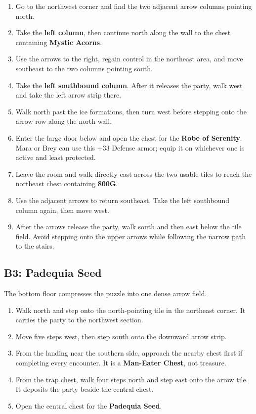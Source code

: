 \documentclass[
  american,
  10pt,
  letterpaper,
  oneside,
  open=any]{scrreprt}
\providecommand{\tightlist}{%
  \setlength{\itemsep}{0pt}\setlength{\parskip}{0pt}}
\begin{document}
\begin{enumerate}
\def\labelenumi{\arabic{enumi}.}
\tightlist
\item
  Go to the northwest corner and find the two adjacent arrow columns
  pointing north.
\item
  Take the \textbf{left column}, then continue north along the wall to
  the chest containing \textbf{Mystic Acorns}.
\item
  Use the arrows to the right, regain control in the northeast area, and
  move southeast to the two columns pointing south.
\item
  Take the \textbf{left southbound column}. After it releases the party,
  walk west and take the left arrow strip there.
\item
  Walk north past the ice formations, then turn west before stepping
  onto the arrow row along the north wall.
\item
  Enter the large door below and open the chest for the \textbf{Robe of
  Serenity}. Mara or Brey can use this +33 Defense armor; equip it on
  whichever one is active and least protected.
\item
  Leave the room and walk directly east across the two usable tiles to
  reach the northeast chest containing \textbf{800G}.
\item
  Use the adjacent arrows to return southeast. Take the left southbound
  column again, then move west.
\item
  After the arrows release the party, walk south and then east below the
  tile field. Avoid stepping onto the upper arrows while following the
  narrow path to the stairs.
\end{enumerate}

\subsection{B3: Padequia Seed}\label{b3-padequia-seed}

The bottom floor compresses the puzzle into one dense arrow field.

\begin{enumerate}
\def\labelenumi{\arabic{enumi}.}
\tightlist
\item
  Walk north and step onto the north-pointing tile in the northeast
  corner. It carries the party to the northwest section.
\item
  Move five steps west, then step south onto the downward arrow strip.
\item
  From the landing near the southern side, approach the nearby chest
  first if completing every encounter. It is a \textbf{Man-Eater Chest},
  not treasure.
\item
  From the trap chest, walk four steps north and step east onto the
  arrow tile. It deposits the party beside the central chest.
\item
  Open the central chest for the \textbf{Padequia Seed}.
\end{enumerate}
\end{document}
